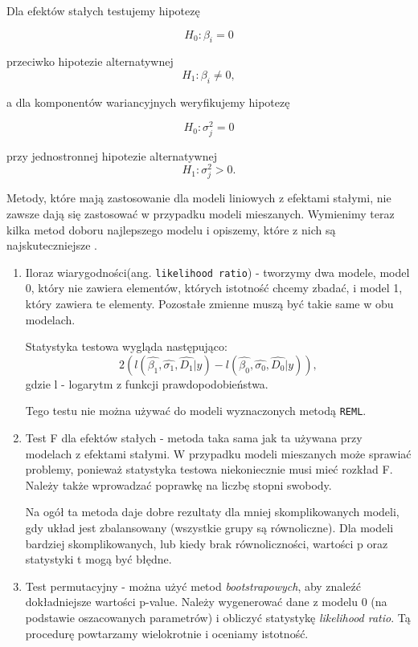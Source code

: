 \documentclass[12pt]{mwbk}
\theoremstyle{plain}
\theoremstyle{definition}
\theoremstyle{remark}
\begin{document}
Dla efektów stałych testujemy hipotezę

$$H_0: \beta_i=0$$

przeciwko hipotezie alternatywnej $$H_1: \beta_i \neq 0,$$

a dla komponentów wariancyjnych weryfikujemy hipotezę

$$H_0: \sigma^2_j=0$$

przy jednostronnej hipotezie alternatywnej 
$$H_1: \sigma^2_j>0.$$



Metody, które mają zastosowanie dla modeli liniowych z efektami stałymi, nie zawsze dają się zastosować w przypadku modeli mieszanych. Wymienimy teraz kilka metod doboru najlepszego modelu i opiszemy, które z nich są najskuteczniejsze \cite{faraway}.

\begin{enumerate}
	\item Iloraz wiarygodności(ang. \texttt{likelihood ratio}) - tworzymy dwa modele, model 0, który nie zawiera elementów, których istotność chcemy zbadać, i model 1, który zawiera te elementy. Pozostałe zmienne muszą być takie same w obu modelach.
	
	Statystyka testowa wygląda następująco:
	$$2(l(\hat{\beta_1}, \hat{\sigma_1}, \hat{D_1}|y)-l(\hat{\beta_0}, \hat{\sigma_0}, \hat{D_0}|y)),$$
	gdzie l - logarytm z funkcji prawdopodobieństwa.
	
	Tego testu nie można używać do modeli wyznaczonych metodą \texttt{REML}.
	
	\item Test F dla efektów stałych - metoda taka sama jak ta używana przy modelach z efektami stałymi. W przypadku modeli mieszanych może sprawiać problemy, ponieważ statystyka testowa niekoniecznie musi mieć rozkład F. Należy także wprowadzać poprawkę na liczbę stopni swobody.
	
	Na ogół ta metoda daje dobre rezultaty dla mniej skomplikowanych modeli, gdy układ jest zbalansowany (wszystkie grupy są równoliczne). Dla modeli bardziej skomplikowanych, lub kiedy brak równoliczności, wartości p oraz statystyki t mogą być błędne.
	
	\item Test permutacyjny - można użyć metod \textit{bootstrapowych}, aby znaleźć dokładniejsze wartości p-value. Należy wygenerować dane z modelu 0 (na podstawie oszacowanych parametrów) i obliczyć statystykę \textit{likelihood ratio}. Tą procedurę powtarzamy wielokrotnie i oceniamy istotność.
	

\end{enumerate}
\end{document}
